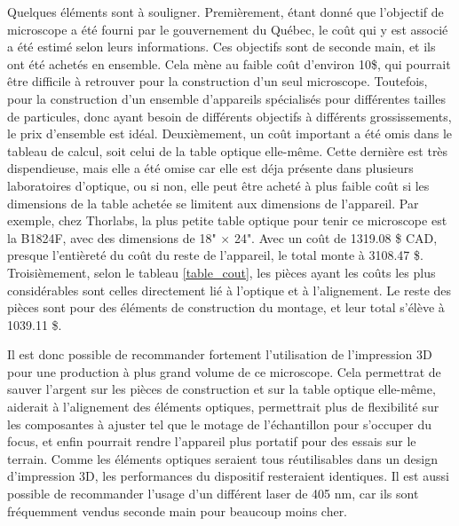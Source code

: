 \documentclass[11pt,letterpaper]{article}
\begin{document}
Quelques éléments sont à souligner. Premièrement, étant donné que l'objectif de microscope a
été fourni par le gouvernement du Québec, le coût qui y est associé a été estimé selon leurs
informations. Ces objectifs sont de seconde main, et ils ont été achetés en ensemble. Cela mène
au faible coût d'environ 10\$, qui pourrait être difficile à retrouver pour la construction d'un
seul microscope. Toutefois, pour la construction d'un ensemble d'appareils spécialisés pour
différentes tailles de particules, donc ayant besoin de différents objectifs à différents 
grossissements, le prix d'ensemble est idéal. Deuxièmement, un coût important a été omis dans 
le tableau de calcul, soit celui de la table optique elle-même. Cette dernière est très
dispendieuse, mais elle a été omise car elle est déja présente dans plusieurs laboratoires 
d'optique, ou si non, elle peut être acheté à plus faible coût si les dimensions de la table
achetée se limitent aux dimensions de l'appareil. Par exemple, chez Thorlabs, la plus petite 
table optique pour tenir ce microscope est la B1824F, avec des dimensions de 18" $\times$ 24".
Avec un coût de 1319.08 \$ CAD, presque l'entièreté du coût du reste de l'appareil, le total
monte à 3108.47 \$. Troisièmement, selon le tableau \ref{table_cout}, les pièces ayant les
coûts les plus considérables sont celles directement lié à l'optique et à l'alignement. Le
reste des pièces sont pour des éléments de construction du montage, et leur total s'élève à
1039.11 \$.

Il est donc possible de recommander fortement l'utilisation de l'impression 3D pour une production
à plus grand volume de ce microscope. Cela permettrat de sauver l'argent sur les pièces de
construction et sur la table optique elle-même, aiderait à l'alignement des éléments optiques,
permettrait plus de flexibilité sur les composantes à ajuster tel que le motage de l'échantillon pour
s'occuper du focus, et enfin pourrait rendre l'appareil plus portatif pour des essais sur le terrain.
Comme les éléments optiques seraient tous réutilisables dans un design d'impression 3D, les
performances du dispositif resteraient identiques. Il est aussi possible de recommander l'usage
d'un différent laser de 405 nm, car ils sont fréquemment vendus seconde main pour beaucoup moins
cher.

% 
% 
\end{document}
